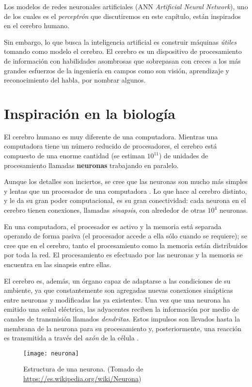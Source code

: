 Los modelos de redes neuronales artificiales (ANN \textit{Artificial
Neural Network}), uno de los cuales es el
\textit{perceptrón} que discutiremos en este capítulo, están
inspirados en el cerebro humano.

Sin embargo, lo que busca la inteligencia artificial es construir
máquinas \textit{útiles} tomando como modelo el cerebro. El cerebro es
un dispositivo de procesamiento de información con habilidades
asombrosas que sobrepasan con creces a los más grandes esfuerzos de la
ingeniería en campos como son visión, aprendizaje y reconocimiento del habla,
por nombrar algunos.

\section{Inspiración en la biología}
El cerebro humano es muy diferente de una computadora. Mientras una
computadora tiene un número reducido de procesadores, el cerebro está
compuesto de una enorme cantidad (se estiman $10^{11}$) de unidades de
procesamiento llamadas \textbf{neuronas} trabajando en paralelo.

Aunque los detalles son inciertos, se cree que las neuronas son mucho
más simples y lentas que un procesador de una computadora
\cite{ethem}. Lo que hace al cerebro distinto, y le da su gran poder
computacional, es su gran conectividad: cada neurona en el cerebro
tienen conexiones, llamadas \textit{sinapsis}, con alrededor de otras
$10^{4}$ neuronas.

En una computadora, el procesador es activo y la memoria está separada
operando de forma pasiva (el procesador accede a ella sólo cuando se
requiere); se cree que en el cerebro, tanto el procesamiento como la
memoria están distribuidos por toda la red. El procesamiento es
efectuado por las neuronas y la memoria se encuentra en las sinapsis
entre ellas.

El cerebro es, además, un órgano capaz de adaptarse a las condiciones
de su ambiente, ya que constantemente son agregadas nuevas conexiones
sinápticas entre neuronas y modificadas las ya existentes. Una vez que
una neurona ha emitido una señal eléctrica, las adyacentes reciben la
información por medio de canales de transmisión llamados
\textit{dendritas}. Estos impulsos son llevados hasta la membrana
de la neurona para su procesamiento y, posteriormente, una reacción es
transmitida a través del \textit{axón} de la célula
\cite{memes}.
\begin{figure}[h]
  \texttt{[image: neurona]} \centering
  \caption{Estructura de una neurona. (Tomado de
    \url{https://es.wikipedia.org/wiki/Neurona})}
\end{figure}

